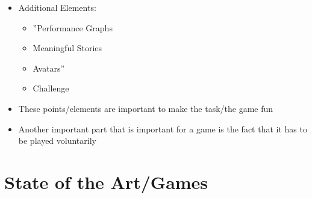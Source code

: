 \documentclass{article}
\theoremstyle{definition}
\theoremstyle{remark}
\begin{document}
\begin{itemize}
    \item Additional Elements: 
    \begin{itemize}
        \item ''Performance Graphs
        \item Meaningful Stories
        \item Avatars'' \cite{wiki}
        \item Challenge 
    \end{itemize}
    \item These points/elements are important to make the task/the game fun
    \item Another important part that is important for a game is the fact that it has to be played voluntarily
\end{itemize}

\section{State of the Art/Games}
\end{document}
